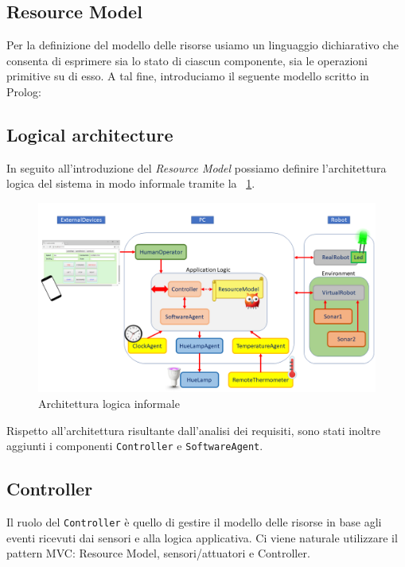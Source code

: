 \documentclass{../llncs}
\newcommand{\labelfig}[1]{\label{fig:#1}}
\newcommand{\xf}[1]{\figurename~\ref{fig:#1}}
\begin{document}
\subsection{Resource Model}
Per la definizione del modello delle risorse usiamo un linguaggio dichiarativo che consenta di esprimere sia lo stato di ciascun componente, sia le operazioni primitive su di esso. A tal fine, introduciamo il seguente modello scritto in Prolog:\\



\subsection{Logical architecture}
In seguito all'introduzione del \emph{Resource Model} possiamo definire l'architettura logica del sistema in modo informale tramite la \xf{informalLA}.

\begin{figure}[!htb]
\centering
\includegraphics[scale=0.4]{img/informalArchitecture2.png}
\caption{Architettura logica informale}\labelfig{informalLA}
\end{figure}

Rispetto all'architettura risultante dall'analisi dei requisiti, sono stati inoltre aggiunti i componenti \texttt{Controller} e \texttt{SoftwareAgent}.

\subsection{Controller}
Il ruolo del \texttt{Controller} è quello di gestire il modello delle risorse in base agli eventi ricevuti dai sensori e alla logica applicativa. Ci viene naturale utilizzare il pattern MVC: Resource Model, sensori/attuatori e Controller.
\end{document}
